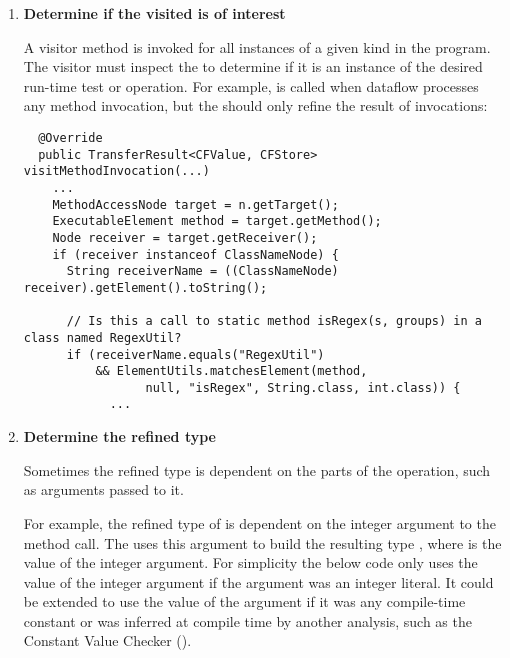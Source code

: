 \begin{enumerate}
\item \textbf{Determine if the visited  is of
    interest}

A visitor method is invoked for all
instances of a given  kind in the
program.
The visitor must inspect the
 to determine if it is an
instance of the desired run-time test or operation.  For example,
 is called when dataflow processes any method
invocation, but the  should only refine
the result of  invocations:

\begin{smaller}
\begin{Verbatim}
  @Override
  public TransferResult<CFValue, CFStore> visitMethodInvocation(...)
    ...
    MethodAccessNode target = n.getTarget();
    ExecutableElement method = target.getMethod();
    Node receiver = target.getReceiver();
    if (receiver instanceof ClassNameNode) {
      String receiverName = ((ClassNameNode) receiver).getElement().toString();

      // Is this a call to static method isRegex(s, groups) in a class named RegexUtil?
      if (receiverName.equals("RegexUtil")
          && ElementUtils.matchesElement(method,
                 null, "isRegex", String.class, int.class)) {
            ...
\end{Verbatim}
\end{smaller}

\item \textbf{Determine the refined type}

Sometimes the refined type is dependent on the parts of the operation,
such as arguments passed to it.

For example, the refined type of  is dependent on the
integer argument to the method call. The 
uses this argument to build the resulting type , where 
is the value of the integer argument.  For simplicity the below code only uses
the value of the integer argument if the argument was an integer literal.  It
could be extended to use the value of the argument if it was any compile-time
constant or was inferred at compile time by another analysis, such as the
Constant Value Checker ().


\end{enumerate}
